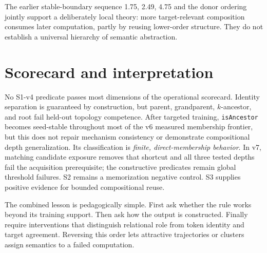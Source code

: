 \documentclass[10pt]{article}
\begin{document}
The earlier stable-boundary sequence 1.75, 2.49, 4.75 and the donor ordering jointly support a deliberately local theory: more target-relevant composition consumes later computation, partly by reusing lower-order structure. They do not establish a universal hierarchy of semantic abstraction.

\section{Scorecard and interpretation}
No S1-v4 predicate passes most dimensions of the operational scorecard. Identity separation is guaranteed by construction, but parent, grandparent, $k$-ancestor, and root fail held-out topology competence. After targeted training, \texttt{isAncestor} becomes seed-stable throughout most of the v6 measured membership frontier, but this does not repair mechanism consistency or demonstrate compositional depth generalization. Its classification is \emph{finite, direct-membership behavior}. In v7, matching candidate exposure removes that shortcut and all three tested depths fail the acquisition prerequisite; the constructive predicates remain global threshold failures. S2 remains a memorization negative control. S3 supplies positive evidence for bounded compositional reuse.

The combined lesson is pedagogically simple. First ask whether the rule works beyond its training support. Then ask how the output is constructed. Finally require interventions that distinguish relational role from token identity and target agreement. Reversing this order lets attractive trajectories or clusters assign semantics to a failed computation.
\end{document}
